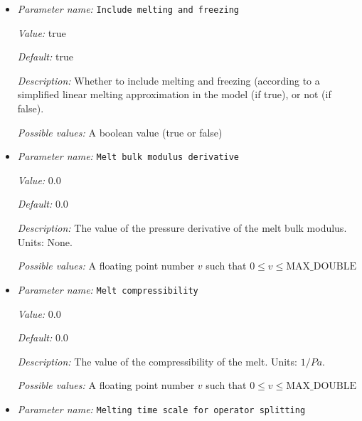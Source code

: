 \begin{itemize}
{\it Default:} 27


{\it Description:} The porosity dependence of the viscosity. Units: dimensionless.


{\it Possible values:} A floating point number $v$ such that $0 \leq v \leq \text{MAX\_DOUBLE}$
\item {\it Parameter name:} {\tt Include melting and freezing}
\label{parameters:Material model/Melt global/Include melting and freezing}
\label{parameters:Material_20model/Melt_20global/Include_20melting_20and_20freezing}


{\it Value:} true


{\it Default:} true


{\it Description:} Whether to include melting and freezing (according to a simplified linear melting approximation in the model (if true), or not (if false).


{\it Possible values:} A boolean value (true or false)
\item {\it Parameter name:} {\tt Melt bulk modulus derivative}
\label{parameters:Material model/Melt global/Melt bulk modulus derivative}
\label{parameters:Material_20model/Melt_20global/Melt_20bulk_20modulus_20derivative}


{\it Value:} 0.0


{\it Default:} 0.0


{\it Description:} The value of the pressure derivative of the melt bulk modulus. Units: None.


{\it Possible values:} A floating point number $v$ such that $0 \leq v \leq \text{MAX\_DOUBLE}$
\item {\it Parameter name:} {\tt Melt compressibility}
\label{parameters:Material model/Melt global/Melt compressibility}
\label{parameters:Material_20model/Melt_20global/Melt_20compressibility}


{\it Value:} 0.0


{\it Default:} 0.0


{\it Description:} The value of the compressibility of the melt. Units: $1/Pa$.


{\it Possible values:} A floating point number $v$ such that $0 \leq v \leq \text{MAX\_DOUBLE}$
\item {\it Parameter name:} {\tt Melting time scale for operator splitting}
\label{parameters:Material model/Melt global/Melting time scale for operator splitting}
\label{parameters:Material_20model/Melt_20global/Melting_20time_20scale_20for_20operator_20splitting}



\end{itemize}
